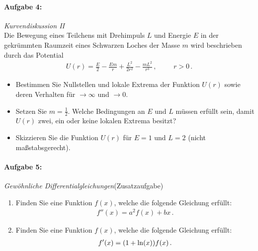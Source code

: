 \paragraph{Aufgabe 4: } \emph{Kurvendiskussion II}\\[0.2cm]
Die Bewegung eines Teilchens mit Drehimpuls $L$ und Energie $E$ in der gekrümmten Raumzeit eines Schwarzen Loches der Masse $m$ wird beschrieben durch das Potential
\begin{align*}
U(r)=\frac{E}{2}-\frac{Em}{r}+\frac{L^2}{2r^2}-\frac{mL^2}{r^3}\,, \hspace{1cm} r>0\,.
\end{align*}
\begin{itemize}
\item Bestimmen Sie Nullstellen und lokale Extrema der Funktion $U(r)$ sowie deren Verhalten für $\to\infty$ und $\to 0$.
\item Setzen Sie $m=\frac{1}{2}$. Welche Bedingungen an $E$ und $L$ müssen erfüllt sein, damit $U(r)$ zwei, ein oder keine lokalen Extrema besitzt?
\item Skizzieren Sie die Funktion $U(r)$ für $E=1$ und $L=2$ (nicht maßstabsgerecht).
\end{itemize} 
%
\paragraph{Aufgabe 5: } \emph{Gewöhnliche Differentialgleichungen}\hfill (Zusatzaufgabe)\\[0.2cm]
\begin{enumerate}[label=(\alph*)]
\item Finden Sie eine Funktion $f(x)$, welche die folgende Gleichung erfüllt:
\begin{align*}
f''(x)=a^2f(x)+bx\,.
\end{align*}
\item Finden Sie eine Funktion $f(x)$, welche die folgende Gleichung erfüllt:
\begin{align*}
f'(x)=\qty(1+\ln(x))f(x)\,.
\end{align*}
\end{enumerate}